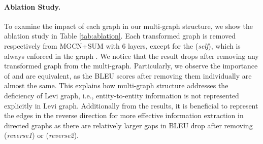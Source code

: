 \documentclass[11pt,a4paper]{article}
\begin{document}
\paragraph{Ablation Study.}
To examine the impact of each graph in our multi-graph structure, 
we show the ablation study in Table \ref{tab:ablation}.
Each transformed graph is removed respectively from MGCN+SUM with 6 layers, except for the  (\textit{self}), which is always enforced in the graph \cite{kipf2016semi}.
We notice that the result drops after removing any transformed graph from the multi-graph.
Particularly, we observe the importance of  and  are equivalent, as the BLEU scores after removing them individually are almost the same.
This explains how multi-graph structure addresses the deficiency of Levi graph, i.e., entity-to-entity information 
is not represented explicitly in Levi graph. 
Additionally from the results, it is beneficial to represent the edges in the reverse direction for more effective information extraction in directed graphs as there are relatively larger gaps in BLEU drop after removing  (\textit{reverse1}) or  (\textit{reverse2}).


\begin{table}[t!]
	\centering
\caption{An example of generated sentences.}
	\label{tab:case}
\end{table}
\end{document}
